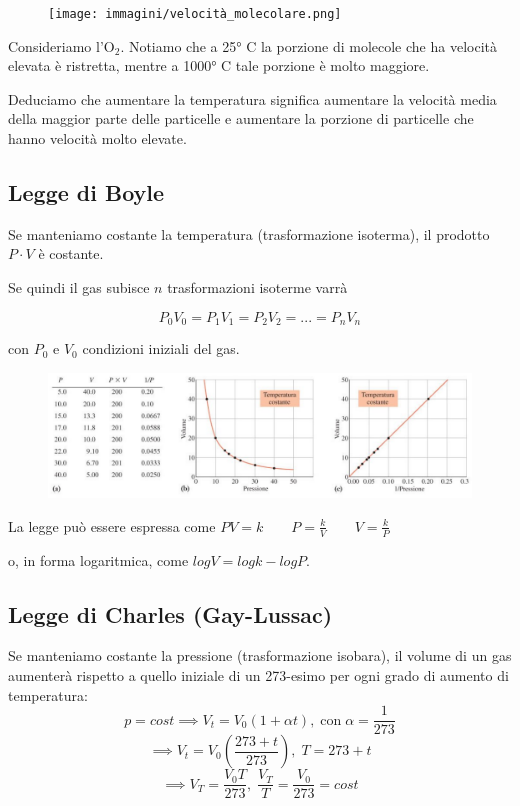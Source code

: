 \hspace{0.5cm}\begin{minipage}{0.55 \textwidth}
    \begin{figure}[H]
        \texttt{[image: immagini/velocità\_molecolare.png]}
    \end{figure}
\end{minipage}
\begin{minipage}{0.4 \textwidth}
Consideriamo l'O$_2$. Notiamo che a 25° C la porzione di molecole che ha velocità elevata è ristretta, mentre a 1000° C tale porzione è molto maggiore.

Deduciamo che aumentare la temperatura significa aumentare la velocità media della maggior parte delle particelle e aumentare la porzione di particelle che hanno velocità molto elevate.
\end{minipage}

\subsection{Legge di Boyle}
Se manteniamo costante la temperatura (trasformazione isoterma), il prodotto $P \cdot V$ è costante.

Se quindi il gas subisce $n$ trasformazioni isoterme varrà

$$P_0V_0=P_1V_1=P_2V_2=...=P_nV_n$$

con $P_0$ e $V_0$ condizioni iniziali del gas.

\begin{figure}[htp]
    \centering
    \includegraphics[width=15cm]{immagini/Legge_di_Boyle.png}
\end{figure}

La legge può essere espressa come $\displaystyle PV=k \qquad P=\frac{k}{V} \qquad V=\frac{k}{P}$

\vspace{0.2cm}o, in forma logaritmica, come $logV = logk - log P$.
\newpage
\subsection{Legge di Charles (Gay-Lussac)}
Se manteniamo costante la pressione (trasformazione isobara), il volume di un gas aumenterà rispetto a quello iniziale di un 273-esimo per ogni grado di aumento di temperatura:
$$p=cost \implies V_t=V_0(1 + \alpha t), \; \text{con} \; \alpha=\frac{1}{273}$$
$$\implies V_t=V_0 \left( \frac{273 + t}{273} \right), \; T=273 + t$$
$$\implies V_T = \frac{V_0 T}{273}, \; \frac{V_T}{T}=\frac{V_0}{273}=cost$$

